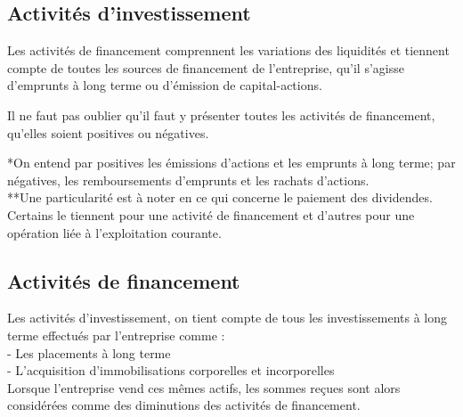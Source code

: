 \subsection{Activités d'investissement}
Les activités de financement comprennent les variations des liquidités et tiennent compte de toutes les sources de financement de l'entreprise, qu'il s'agisse d'emprunts à long terme ou d'émission de capital-actions.

Il ne faut pas oublier qu'il faut y présenter toutes les activités de financement, qu'elles soient positives ou négatives.

{\scriptsize
*On entend par positives les émissions d'actions et les emprunts à long terme; par négatives, les remboursements d'emprunts et les rachats d'actions.\\
**Une particularité est à noter en ce qui concerne le paiement des dividendes. Certains le tiennent pour une activité de financement et d'autres pour une opération liée à l'exploitation courante.
}

\subsection{Activités de financement}
Les activités d'investissement, on tient compte de tous les investissements à long terme effectués par l'entreprise comme :\\
- Les placements à long terme\\
- L'acquisition d'immobilisations corporelles et incorporelles\\
Lorsque l'entreprise vend ces mêmes actifs, les sommes reçues sont alors considérées comme des diminutions des activités de financement.
